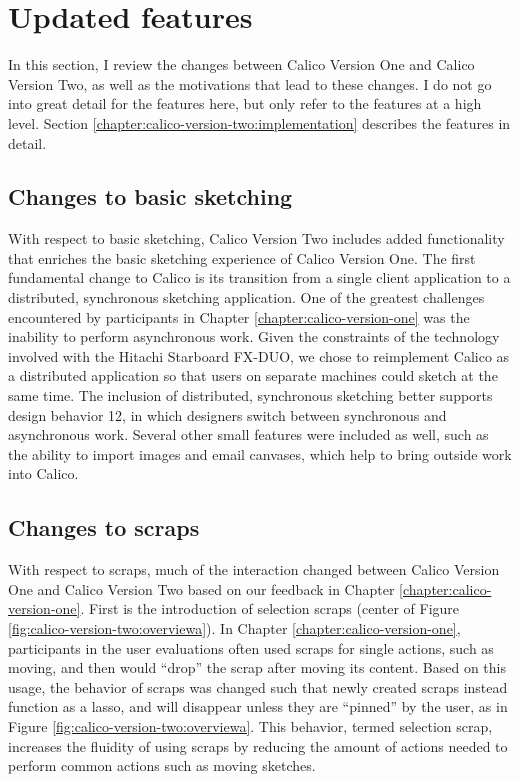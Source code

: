 \documentclass[12pt,fleqn]{ucithesis}
\begin{document}
\section{Updated features}
\label{chapter:calico-version-two:features}

In this section, I review the changes between Calico Version One and Calico Version Two, as well as the motivations that lead to these changes. I do not go into great detail for the features here, but only refer to the features at a high level. Section \ref{chapter:calico-version-two:implementation} describes the features in detail.

\subsection{Changes to basic sketching}

With respect to basic sketching, Calico Version Two includes added functionality that enriches the basic sketching experience of Calico Version One. The first fundamental change to Calico is its transition from a single client application to a distributed, synchronous sketching application. One of the greatest challenges encountered by participants in Chapter \ref{chapter:calico-version-one} was the inability to perform asynchronous work. Given the constraints of the technology involved with the Hitachi Starboard FX-DUO, we chose to reimplement Calico as a distributed application so that users on separate machines could sketch at the same time. The inclusion of distributed, synchronous sketching better supports design behavior 12, in which designers switch between synchronous and asynchronous work. Several other small features were included as well, such as the ability to import images and email canvases, which help to bring outside work into Calico.

\subsection{Changes to scraps}

With respect to scraps, much of the interaction changed between Calico Version One and Calico Version Two based on our feedback in Chapter \ref{chapter:calico-version-one}. First is the introduction of selection scraps (center of Figure \ref{fig:calico-version-two:overviewa}). In Chapter \ref{chapter:calico-version-one}, participants in the user evaluations often used scraps for single actions, such as moving, and then would ``drop'' the scrap after moving its content. Based on this usage, the behavior of scraps was changed such that newly created scraps instead function as a lasso, and will disappear unless they are ``pinned'' by the user, as in Figure \ref{fig:calico-version-two:overviewa}. This behavior, termed selection scrap, increases the fluidity of using scraps by reducing the amount of actions needed to perform common actions such as moving sketches. 
\end{document}
